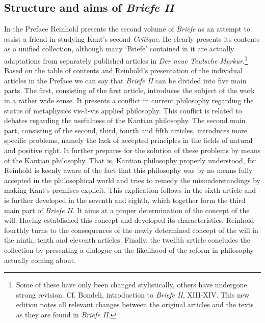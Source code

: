 \subsection{Structure and aims of \textit{Briefe II}}


In the Preface Reinhold presents the second volume of \textit{Briefe} as an attempt to assist a friend in studying Kant's second \textit{Critique}. He clearly presents its contents as a unified collection, although many `Briefe' contained in it are actually adaptations from separately published articles in \textit{Der neue Teutsche Merkur}.\footnote{ Some of these have only been changed stylistically, others have undergone strong revision. Cf. Bondeli, introduction to \textit{Briefe II}, XIII{-}XIV. This new edition notes all relevant changes between the original articles and the texts as they are found in \textit{Briefe II}.} Based on the table of contents and Reinhold's presentation of the individual articles in the Preface we can say that \textit{Briefe II} can be divided into five main parts. The first, consisting of the first article, introduces the subject of the work in a rather wide sense. It presents a conflict in current philosophy regarding the status of metaphysics vis{-}\`{a}{-}vis applied philosophy. This conflict is related to debates regarding the usefulness of the Kantian philosophy. The second main part, consisting of the second, third, fourth and fifth articles, introduces more specific problems, namely the lack of accepted principles in the fields of natural and positive right. It further prepares for the solution of these problems by means of the Kantian philosophy. That is, Kantian philosophy properly understood, for Reinhold is keenly aware of the fact that this philosophy was by no means fully accepted in the philosophical world and tries to remedy the misunderstandings by making Kant's premises explicit. This explication follows in the sixth article and is further developed in the seventh and eighth, which together form the third main part of \textit{Briefe II}. It aims at a proper determination of the concept of the will. Having established this concept and developed its characteristics, Reinhold fourthly turns to the consequences of the newly determined concept of the will in the ninth, tenth and eleventh articles. Finally, the twelfth article concludes the collection by presenting a dialogue on the likelihood of the reform in philosophy actually coming about.

